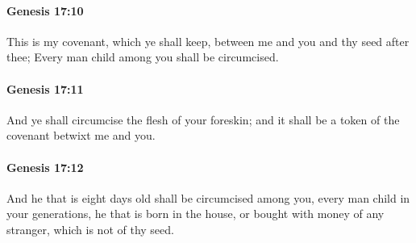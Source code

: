 		\paragraph{Genesis 17:10} %
			\label{GENESIS-17-10}

			This is my covenant, which ye shall keep, between me and you and thy seed after thee; Every man child among you shall be circumcised.


		\paragraph{Genesis 17:11} %
			\label{GENESIS-17-11}

			And ye shall circumcise the flesh of your foreskin; and it shall be a token of the covenant betwixt me and you.


		\paragraph{Genesis 17:12} %
			\label{GENESIS-17-12}

			And he that is eight days old shall be circumcised among you, every man child in your generations, he that is born in the house, or bought with money of any stranger, which is not of thy seed.


